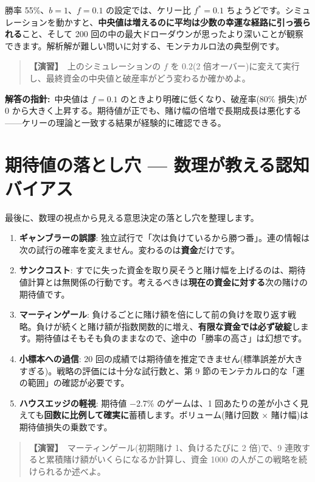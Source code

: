 \documentclass{article}
\begin{document}
勝率 55\%、\(b = 1\)、\(f = 0.1\) の設定では、ケリー比 \(f^* = 0.1\) ちょうどです。シミュレーションを動かすと、\textbf{中央値は増えるのに平均は少数の幸運な経路に引っ張られる}こと、そして 200 回の中の最大ドローダウンが思ったより深いことが観察できます。解析解が難しい問いに対する、モンテカルロ法の典型例です。

\begin{quote}
\textbf{【演習】}\ 上のシミュレーションの \(f\) を \(0.2\)(2 倍オーバー)に変えて実行し、最終資金の中央値と破産率がどう変わるか確かめよ。
\end{quote}

\textbf{解答の指針:}\ 中央値は \(f = 0.1\) のときより明確に低くなり、破産率(80\% 損失)が 0 から大きく上昇する。期待値が正でも、賭け幅の倍増で長期成長は悪化する——ケリーの理論と一致する結果が経験的に確認できる。

\section{期待値の落とし穴 — 数理が教える認知バイアス}

最後に、数理の視点から見える意思決定の落とし穴を整理します。

\begin{enumerate}
\item \textbf{ギャンブラーの誤謬}: 独立試行で「次は負けているから勝つ番」。連の情報は次の試行の確率を変えません。変わるのは\textbf{資金}だけです。
\item \textbf{サンクコスト}: すでに失った資金を取り戻そうと賭け幅を上げるのは、期待値計算とは無関係の行動です。考えるべきは\textbf{現在の資金に対する}次の賭けの期待値です。
\item \textbf{マーティンゲール}: 負けるごとに賭け額を倍にして前の負けを取り返す戦略。負けが続くと賭け額が指数関数的に増え、\textbf{有限な資金では必ず破綻}します。期待値はそもそも負のままなので、途中の「勝率の高さ」は幻想です。
\item \textbf{小標本への過信}: 20 回の成績では期待値を推定できません(標準誤差が大きすぎる)。戦略の評価には十分な試行数と、第 9 節のモンテカルロ的な「運の範囲」の確認が必要です。
\item \textbf{ハウスエッジの軽視}: 期待値 −2.7\% のゲームは、1 回あたりの差が小さく見えても\textbf{回数に比例して確実に}蓄積します。ボリューム(賭け回数 × 賭け幅)は期待値損失の乗数です。
\end{enumerate}

\begin{quote}
\textbf{【演習】}\ マーティンゲール(初期賭け 1、負けるたびに 2 倍)で、9 連敗すると累積賭け額がいくらになるか計算し、資金 1000 の人がこの戦略を続けられるか述べよ。
\end{quote}
\end{document}
